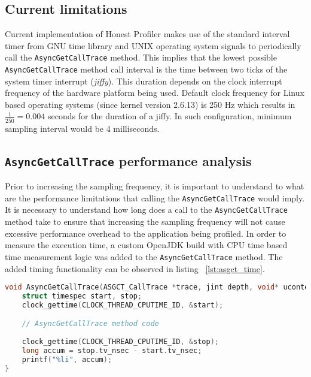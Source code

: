 \documentclass[..thesis.tex]{subfiles}
\begin{document}
\subsection{Current limitations}
Current implementation of Honest Profiler makes use of the standard interval timer from GNU time library and UNIX operating system signals to periodically call the \texttt{AsyncGetCallTrace} method. This implies that the lowest possible \texttt{Async\-Get\-Call\-Trace} method call interval is the time between two ticks of the system timer interrupt (\textit{jiffy}). This duration depends on the clock interrupt frequency of the hardware platform being used. Default clock frequency for Linux based operating systems (since kernel version 2.6.13) is 250 Hz which results in $\frac{1}{250} = 0.004$ seconds for the duration of a jiffy. \cite{linux_time} In such configuration, minimum sampling interval would be 4 milliseconds.


\subsection{\texttt{AsyncGetCallTrace} performance analysis}
Prior to increasing the sampling frequency, it is important to understand to what are the performance limitations that calling the \texttt{Async\-Get\-Call\-Trace} would imply. It is necessary to understand how long does a call to the \texttt{Async\-Get\-Call\-Trace} method take  to ensure that increasing the sampling frequency will not cause excessive performance overhead to the application being profiled. In order to measure the execution time, a custom OpenJDK build with CPU time based time measurement logic was added to the \texttt{Async\-Get\-Call\-Trace} method. The added timing functionality can be observed in listing ~\ref{lst:asgct_time}.

\begin{lstlisting}[language=C++,style=def,label={lst:asgct_time}, caption={CPU time based measurement in \texttt{AsyncGetCallTrace} method}]
void AsyncGetCallTrace(ASGCT_CallTrace *trace, jint depth, void* ucontext) {
    struct timespec start, stop;
    clock_gettime(CLOCK_THREAD_CPUTIME_ID, &start);

    // AsyncGetCallTrace method code
    
    clock_gettime(CLOCK_THREAD_CPUTIME_ID, &stop);
    long accum = stop.tv_nsec - start.tv_nsec;
    printf("%li", accum);
}
\end{lstlisting}
\end{document}
